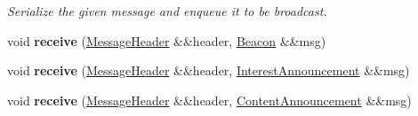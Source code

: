 \begin{DoxyCompactItemize}
\begin{DoxyCompactList}\small\item\em Serialize the given message and enqueue it to be broadcast. \end{DoxyCompactList}\item 
\hypertarget{classsma_1_1CcnNode_a78dda9e33a7cd64bd8e3304c2249767c}{void {\bfseries receive} (\hyperlink{structsma_1_1MessageHeader}{Message\-Header} \&\&header, \hyperlink{structsma_1_1Beacon}{Beacon} \&\&msg)}\label{classsma_1_1CcnNode_a78dda9e33a7cd64bd8e3304c2249767c}

\item 
\hypertarget{classsma_1_1CcnNode_af49617977e2a7124493584c28bc48ff9}{void {\bfseries receive} (\hyperlink{structsma_1_1MessageHeader}{Message\-Header} \&\&header, \hyperlink{structsma_1_1InterestAnnouncement}{Interest\-Announcement} \&\&msg)}\label{classsma_1_1CcnNode_af49617977e2a7124493584c28bc48ff9}

\item 
\hypertarget{classsma_1_1CcnNode_accc58574aaf81740459399ca4aceec6c}{void {\bfseries receive} (\hyperlink{structsma_1_1MessageHeader}{Message\-Header} \&\&header, \hyperlink{structsma_1_1ContentAnnouncement}{Content\-Announcement} \&\&msg)}\label{classsma_1_1CcnNode_accc58574aaf81740459399ca4aceec6c}

\end{DoxyCompactItemize}
